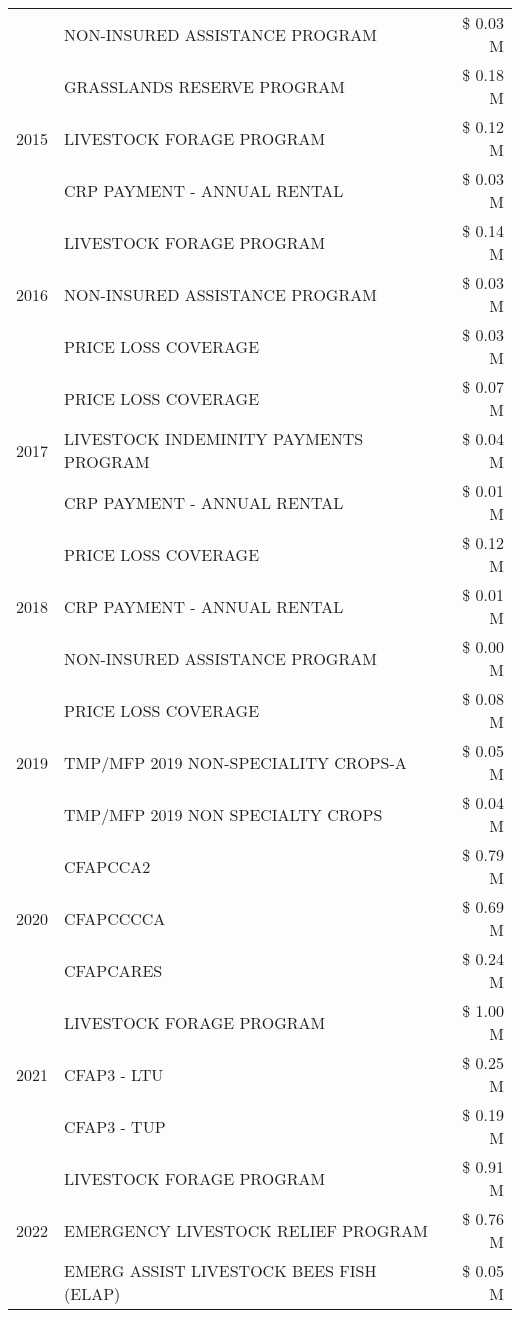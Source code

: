 \begin{tabular}{llr}
 & NON-INSURED ASSISTANCE PROGRAM & \$ 0.03 M \\
\cline{1-3}
\multirow[t]{3}{*}{2015} & GRASSLANDS RESERVE PROGRAM & \$ 0.18 M \\
 & LIVESTOCK FORAGE PROGRAM & \$ 0.12 M \\
 & CRP PAYMENT - ANNUAL RENTAL & \$ 0.03 M \\
\cline{1-3}
\multirow[t]{3}{*}{2016} & LIVESTOCK FORAGE PROGRAM & \$ 0.14 M \\
 & NON-INSURED ASSISTANCE PROGRAM & \$ 0.03 M \\
 & PRICE LOSS COVERAGE & \$ 0.03 M \\
\cline{1-3}
\multirow[t]{3}{*}{2017} & PRICE LOSS COVERAGE & \$ 0.07 M \\
 & LIVESTOCK INDEMINITY PAYMENTS PROGRAM & \$ 0.04 M \\
 & CRP PAYMENT - ANNUAL RENTAL & \$ 0.01 M \\
\cline{1-3}
\multirow[t]{3}{*}{2018} & PRICE LOSS COVERAGE & \$ 0.12 M \\
 & CRP PAYMENT - ANNUAL RENTAL & \$ 0.01 M \\
 & NON-INSURED ASSISTANCE PROGRAM & \$ 0.00 M \\
\cline{1-3}
\multirow[t]{3}{*}{2019} & PRICE LOSS COVERAGE & \$ 0.08 M \\
 & TMP/MFP 2019 NON-SPECIALITY CROPS-A & \$ 0.05 M \\
 & TMP/MFP 2019 NON SPECIALTY CROPS & \$ 0.04 M \\
\cline{1-3}
\multirow[t]{3}{*}{2020} & CFAPCCA2 & \$ 0.79 M \\
 & CFAPCCCCA & \$ 0.69 M \\
 & CFAPCARES & \$ 0.24 M \\
\cline{1-3}
\multirow[t]{3}{*}{2021} & LIVESTOCK FORAGE PROGRAM & \$ 1.00 M \\
 & CFAP3 - LTU & \$ 0.25 M \\
 & CFAP3 - TUP & \$ 0.19 M \\
\cline{1-3}
\multirow[t]{3}{*}{2022} & LIVESTOCK FORAGE PROGRAM & \$ 0.91 M \\
 & EMERGENCY LIVESTOCK RELIEF PROGRAM & \$ 0.76 M \\
 & EMERG ASSIST LIVESTOCK BEES FISH (ELAP) & \$ 0.05 M \\
\cline{1-3}
\bottomrule
\end{tabular}
